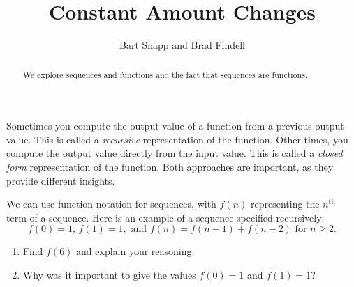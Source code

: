 \documentclass[nooutcomes]{ximera}
\title{Constant Amount Changes}
\author{Bart Snapp and Brad Findell}
\begin{document}
\begin{abstract}
  We explore sequences and functions and the fact that sequences are
  functions.
\end{abstract}
\maketitle

\label{A:ConstantAmount}

Sometimes you compute the output value of a function from a previous output value.  This is called a \emph{recursive} representation of the function.  Other times, you compute the output value directly from the input value.  This is called a \emph{closed form} representation of the function.  Both approaches are important, as they provide different insights.  

\begin{problem}
We can use function notation for sequences, with $f(n)$ representing the $n^\mathrm{th}$ term of a sequence.  Here is an example of a sequence specified recursively:  
$$f(0) = 1\text{, }f(1) = 1,\text{ and }f(n) = f(n-1)+f(n-2)\text{ for }n \ge 2.$$
\begin{enumerate}
\item Find $f(6)$ and explain your reasoning.  
\item Why was it important to give the values $f(0) = 1$ and $f(1) = 1$?  
\end{enumerate}
\end{problem}
\end{document}
